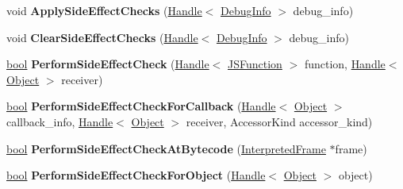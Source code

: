 \begin{DoxyCompactItemize}
void {\bfseries Apply\+Side\+Effect\+Checks} (\mbox{\hyperlink{classv8_1_1internal_1_1Handle}{Handle}}$<$ \mbox{\hyperlink{classv8_1_1internal_1_1DebugInfo}{Debug\+Info}} $>$ debug\+\_\+info)
\item 
\mbox{\label{classv8_1_1internal_1_1Debug_a3b3c76d6b82075af393181e633aa011a}} 
void {\bfseries Clear\+Side\+Effect\+Checks} (\mbox{\hyperlink{classv8_1_1internal_1_1Handle}{Handle}}$<$ \mbox{\hyperlink{classv8_1_1internal_1_1DebugInfo}{Debug\+Info}} $>$ debug\+\_\+info)
\item 
\mbox{\label{classv8_1_1internal_1_1Debug_adba53f560561dd417903a9ff20901308}} 
\mbox{\hyperlink{classbool}{bool}} {\bfseries Perform\+Side\+Effect\+Check} (\mbox{\hyperlink{classv8_1_1internal_1_1Handle}{Handle}}$<$ \mbox{\hyperlink{classv8_1_1internal_1_1JSFunction}{J\+S\+Function}} $>$ function, \mbox{\hyperlink{classv8_1_1internal_1_1Handle}{Handle}}$<$ \mbox{\hyperlink{classv8_1_1internal_1_1Object}{Object}} $>$ receiver)
\item 
\mbox{\label{classv8_1_1internal_1_1Debug_a745590e8422c194391f502e72143d381}} 
\mbox{\hyperlink{classbool}{bool}} {\bfseries Perform\+Side\+Effect\+Check\+For\+Callback} (\mbox{\hyperlink{classv8_1_1internal_1_1Handle}{Handle}}$<$ \mbox{\hyperlink{classv8_1_1internal_1_1Object}{Object}} $>$ callback\+\_\+info, \mbox{\hyperlink{classv8_1_1internal_1_1Handle}{Handle}}$<$ \mbox{\hyperlink{classv8_1_1internal_1_1Object}{Object}} $>$ receiver, Accessor\+Kind accessor\+\_\+kind)
\item 
\mbox{\label{classv8_1_1internal_1_1Debug_aa1da4ff25228851107f81ef494b15746}} 
\mbox{\hyperlink{classbool}{bool}} {\bfseries Perform\+Side\+Effect\+Check\+At\+Bytecode} (\mbox{\hyperlink{classv8_1_1internal_1_1InterpretedFrame}{Interpreted\+Frame}} $\ast$frame)
\item 
\mbox{\label{classv8_1_1internal_1_1Debug_a5d999851011dafabb849abf1747dcecb}} 
\mbox{\hyperlink{classbool}{bool}} {\bfseries Perform\+Side\+Effect\+Check\+For\+Object} (\mbox{\hyperlink{classv8_1_1internal_1_1Handle}{Handle}}$<$ \mbox{\hyperlink{classv8_1_1internal_1_1Object}{Object}} $>$ object)
\item 
\mbox{\label{classv8_1_1internal_1_1Debug_ad1aa6ced53c246fc7f65a7799893a831}} 

\end{DoxyCompactItemize}
